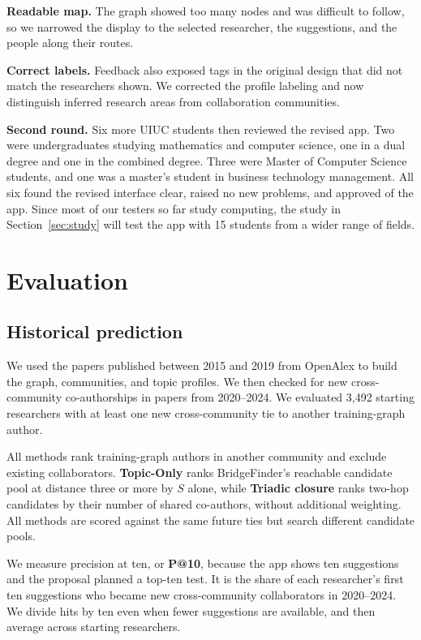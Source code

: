 \documentclass[10pt,twocolumn,letterpaper]{article}
\begin{document}
\textbf{Readable map.} The graph showed too many nodes and was difficult to follow, so we narrowed the display to the selected researcher, the suggestions, and the people along their routes.

\textbf{Correct labels.} Feedback also exposed tags in the original design that did not match the researchers shown. We corrected the profile labeling and now distinguish inferred research areas from collaboration communities.

\textbf{Second round.} Six more UIUC students then reviewed the revised app. Two were undergraduates studying mathematics and computer science, one in a dual degree and one in the combined degree. Three were Master of Computer Science students, and one was a master's student in business technology management. All six found the revised interface clear, raised no new problems, and approved of the app. Since most of our testers so far study computing, the study in Section~\ref{sec:study} will test the app with 15 students from a wider range of fields.

\section{Evaluation}
\subsection{Historical prediction}
We used the papers published between 2015 and 2019 from OpenAlex to build the graph, communities, and topic profiles. We then checked for new cross-community co-authorships in papers from 2020--2024. We evaluated 3,492 starting researchers with at least one new cross-community tie to another training-graph author.

All methods rank training-graph authors in another community and exclude existing collaborators. \textbf{Topic-Only} ranks BridgeFinder's reachable candidate pool at distance three or more by $S$ alone, while \textbf{Triadic closure} ranks two-hop candidates by their number of shared co-authors, without additional weighting. All methods are scored against the same future ties but search different candidate pools.

We measure precision at ten, or \textbf{P@10}, because the app shows ten suggestions and the proposal planned a top-ten test. It is the share of each researcher's first ten suggestions who became new cross-community collaborators in 2020--2024. We divide hits by ten even when fewer suggestions are available, and then average across starting researchers.
\end{document}
